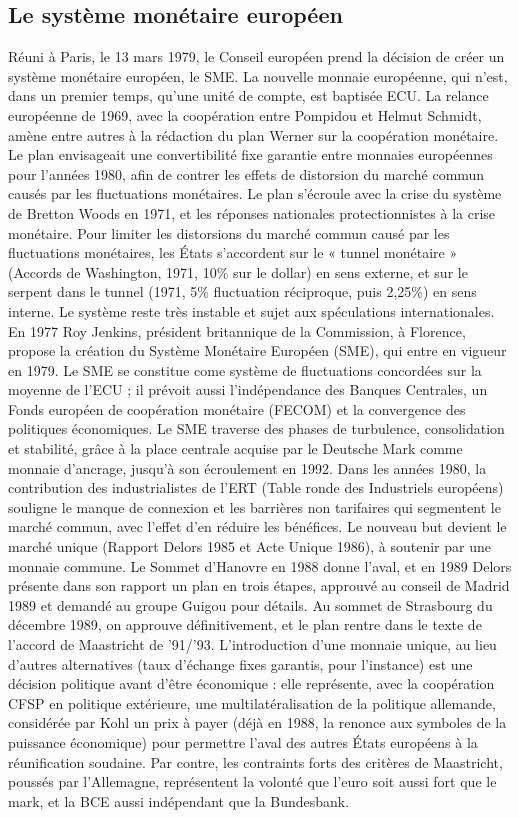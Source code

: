 \documentclass{report}%
\begin{document}
\subsection{Le système monétaire européen}
Réuni à Paris, le 13 mars 1979, le Conseil européen prend la décision de créer un système monétaire européen, le SME. La nouvelle monnaie européenne, qui n'est, dans un premier temps, qu'une unité de compte, est baptisée ECU.
La relance européenne de 1969, avec la coopération entre Pompidou et Helmut Schmidt, amène entre autres à la rédaction du plan Werner sur la coopération monétaire. Le plan envisageait une convertibilité fixe garantie entre monnaies européennes pour l’années 1980, afin de contrer les effets de distorsion du marché commun causés par les fluctuations monétaires. Le plan s’écroule avec la crise du système de Bretton Woods en 1971, et les réponses nationales protectionnistes à la crise monétaire. Pour limiter les distorsions du marché commun causé par les fluctuations monétaires, les États s’accordent sur le « tunnel monétaire » (Accords de Washington, 1971, 10\% sur le dollar) en sens externe, et sur le serpent dans le tunnel (1971, 5\% fluctuation réciproque, puis 2,25\%) en sens interne. Le système reste très instable et sujet aux spéculations internationales.
En 1977 Roy Jenkins, président britannique de la Commission, à Florence, propose la création du Système Monétaire Européen (SME), qui entre en vigueur en 1979. Le SME se constitue come système de fluctuations concordées sur la moyenne de l’ECU ; il prévoit aussi l’indépendance des Banques Centrales, un Fonds européen de coopération monétaire (FECOM) et la convergence des politiques économiques. Le SME traverse des phases de turbulence, consolidation et stabilité, grâce à la place centrale acquise par le Deutsche Mark comme monnaie d’ancrage, jusqu’à son écroulement en 1992.
Dans les années 1980, la contribution des industrialistes de l’ERT (Table ronde des Industriels européens) souligne le manque de connexion et les barrières non tarifaires qui segmentent le marché commun, avec l’effet d’en réduire les bénéfices. Le nouveau but devient le marché unique (Rapport Delors 1985 et Acte Unique 1986), à soutenir par une monnaie commune. Le Sommet d’Hanovre en 1988 donne l’aval, et en 1989 Delors présente dans son rapport un plan en trois étapes, approuvé au conseil de Madrid 1989 et demandé au groupe Guigou pour détails. Au sommet de Strasbourg du décembre 1989, on approuve définitivement, et le plan rentre dans le texte de l’accord de Maastricht de '91/'93. L’introduction d’une monnaie unique, au lieu d’autres alternatives (taux d’échange fixes garantis, pour l’instance) est une décision politique avant d'être économique : elle représente, avec la coopération CFSP en politique extérieure, une multilatéralisation de la politique allemande, considérée par Kohl un prix à payer (déjà en 1988, la renonce aux symboles de la puissance économique) pour permettre l’aval des autres États européens à la réunification soudaine. Par contre, les contraints forts des critères de Maastricht, poussés par l’Allemagne, représentent la volonté que l’euro soit aussi fort que le mark, et la BCE aussi indépendant que la Bundesbank.
\end{document}
